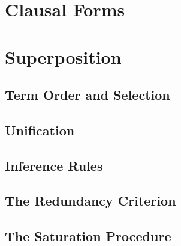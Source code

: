 \section{Clausal Forms}
\section{Superposition}
\subsection{Term Order and Selection}
\subsection{Unification}
\subsection{Inference Rules}
\subsection{The Redundancy Criterion}
\subsection{The Saturation Procedure}
